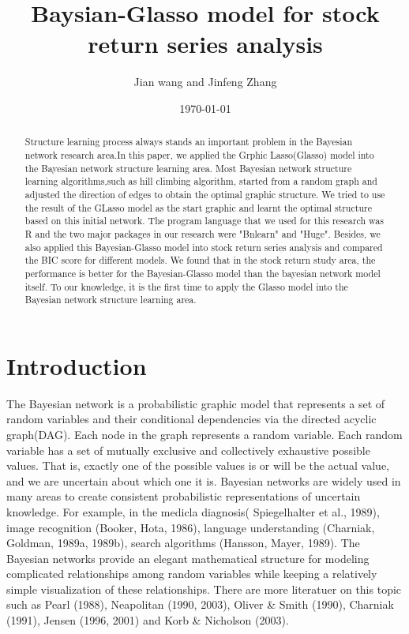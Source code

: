 \documentclass[12pt]{article}
\theoremstyle{plain}
\begin{document}
\title{Baysian-Glasso model for stock return series analysis}

\author{Jian wang  and Jinfeng Zhang}
\date{\today}

\maketitle

\begin{abstract}
Structure learning process always stands an important problem in the Bayesian network research area.In this paper, we applied the Grphic Lasso(Glasso) model into the Bayesian network structure learning area. Most Bayesian network structure learning algorithms,such as hill climbing algorithm, started from a random graph and adjusted the direction of edges to obtain the optimal graphic structure. We tried to use the result of the GLasso model as the start graphic and learnt the optimal structure based on this initial network. The program language that we used for this research was R and the two major packages in our research were "Bnlearn" and "Huge". Besides, we also applied this Bayesian-Glasso model into stock return series analysis and compared the BIC score for different models. We found that in the stock return study area, the performance is better for the Bayesian-Glasso model than the bayesian network model itself. To our knowledge, it is the first time to apply the Glasso model into the Bayesian network structure learning area.

\end{abstract}

\section{Introduction}

The Bayesian network is a probabilistic graphic model that represents a set of random variables and their conditional dependencies via the directed acyclic graph(DAG). Each node in the graph represents a random variable. Each random variable has a set of mutually exclusive and collectively exhaustive possible values. That is, exactly one of the possible values is or will be the actual value, and we are uncertain about which one it is. Bayesian networks are widely used in many areas to create consistent probabilistic representations of uncertain knowledge. For example, in the medicla diagnosis( Spiegelhalter et al., 1989), image recognition (Booker, Hota, 1986), language understanding (Charniak, Goldman, 1989a, 1989b), search algorithms (Hansson, Mayer, 1989). The Bayesian networks provide an elegant mathematical structure for modeling complicated relationships among random variables while keeping a relatively simple visualization of these relationships. There are more literatuer on this topic such as Pearl (1988), Neapolitan (1990, 2003), Oliver \& Smith (1990), Charniak (1991), Jensen (1996, 2001) and  Korb \& Nicholson (2003).\\
\end{document}

